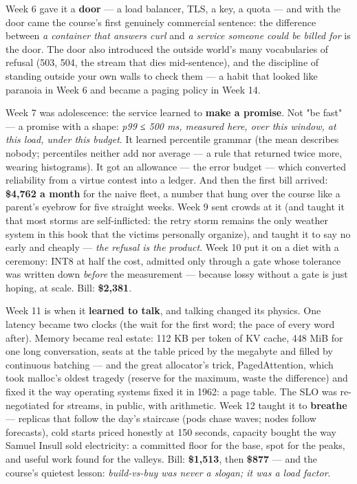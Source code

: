 Week 6 gave it a \textbf{door} — a load balancer, TLS, a key, a quota — and with the door came the course's first genuinely commercial sentence: the difference between \textit{a container that answers curl} and \textit{a service someone could be billed for} is the door. The door also introduced the outside world's many vocabularies of refusal (503, 504, the stream that dies mid-sentence), and the discipline of standing outside your own walls to check them — a habit that looked like paranoia in Week 6 and became a paging policy in Week 14.

Week 7 was adolescence: the service learned to \textbf{make a promise}. Not "be fast" — a promise with a shape: \textit{p99 ≤ 500 ms, measured here, over this window, at this load, under this budget}. It learned percentile grammar (the mean describes nobody; percentiles neither add nor average — a rule that returned twice more, wearing histograms). It got an allowance — the error budget — which converted reliability from a virtue contest into a ledger. And then the first bill arrived: \textbf{\$4,762 a month} for the naive fleet, a number that hung over the course like a parent's eyebrow for five straight weeks. Week 9 sent crowds at it (and taught it that most storms are self-inflicted: the retry storm remains the only weather system in this book that the victims personally organize), and taught it to say no early and cheaply — \textit{the refusal is the product}. Week 10 put it on a diet with a ceremony: INT8 at half the cost, admitted only through a gate whose tolerance was written down \textit{before} the measurement — because lossy without a gate is just hoping, at scale. Bill: \textbf{\$2,381}.

Week 11 is when it \textbf{learned to talk}, and talking changed its physics. One latency became two clocks (the wait for the first word; the pace of every word after). Memory became real estate: 112 KB per token of KV cache, 448 MiB for one long conversation, seats at the table priced by the megabyte and filled by continuous batching — and the great allocator's trick, PagedAttention, which took malloc's oldest tragedy (reserve for the maximum, waste the difference) and fixed it the way operating systems fixed it in 1962: a page table. The SLO was re-negotiated for streams, in public, with arithmetic. Week 12 taught it to \textbf{breathe} — replicas that follow the day's staircase (pods chase waves; nodes follow forecasts), cold starts priced honestly at 150 seconds, capacity bought the way Samuel Insull sold electricity: a committed floor for the base, spot for the peaks, and useful work found for the valleys. Bill: \textbf{\$1,513}, then \textbf{\$877} — and the course's quietest lesson: \textit{build-vs-buy was never a slogan; it was a load factor}.

